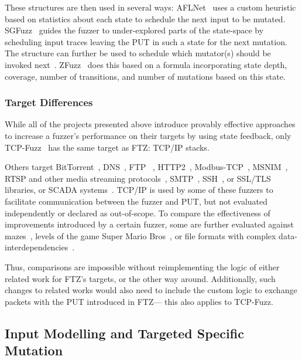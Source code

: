 \documentclass[twocolumn]{article}
\newcommand{\proj}{FTZ\xspace}
\let\savedCite=\cite
\renewcommand{\cite}{\unskip~\savedCite}
\begin{document}
These structures are then used in several ways: AFLNet\cite{AFLNET} uses a custom heuristic based on statistics about each state to schedule the next input to be mutated. SGFuzz\cite{SGFuzz} guides the fuzzer to under-explored parts of the state-space by scheduling input traces leaving the PUT in such a state for the next mutation. The structure can further be used to schedule which mutator(s) should be invoked next\cite{ModelBased}. ZFuzz\cite{ZFuzz} does this based on a formula incorporating state depth, coverage, number of transitions, and number of mutations based on this state.

\subsubsection{Target Differences}
\label{RelatedWorks:ProtocolFuzzing:TargetDifferences}

While all of the projects presented above introduce provably effective approaches to increase a fuzzer's performance on their targets by using state feedback, only TCP-Fuzz\cite{TCPFuzz} has the same target as \proj: TCP/IP stacks.

Others target BitTorrent\cite{Ankou}, DNS\cite{StateAFL}, FTP \cite{AFLNET, FitM, StateAFL, Autofuzz,ZFuzz}, HTTP2\cite{SGFuzz}, Modbus-TCP\cite{ModbusTCP,ModbusTCP2, GANFuzz, MTA, MTFStorm, AnotherModbusTCP}, MSNIM\cite{ModelBased}, RTSP and other media streaming protocols\cite{AFLNET, SGFuzz}, SMTP\cite{StateAFL}, SSH\cite{StateAFL}, or SSL/TLS\cite{SGFuzz,ZFuzz,DDFuzz} libraries, or SCADA systems\cite{EPF}. TCP/IP is used by some of these fuzzers to facilitate communication between the fuzzer and PUT, but not evaluated independently or declared as out-of-scope. To compare the effectiveness of improvements introduced by a certain fuzzer, some are further evaluated against mazes\cite{Ijon, SandPuppy}, levels of the game Super Mario Bros\cite{Ijon, SandPuppy}, or file formats with complex data-interdependencies\cite{Ijon, SandPuppy, DDFuzz, Ankou}.

Thus, comparisons are impossible without reimplementing the logic of either related work for \proj's targets, or the other way around. Additionally, such changes to related works would also need to include the custom logic to exchange packets with the PUT introduced in \proj — this also applies to TCP-Fuzz.

\subsection{Input Modelling and Targeted Specific Mutation}
\label{RelatedWorks:InputModelling}
\end{document}
